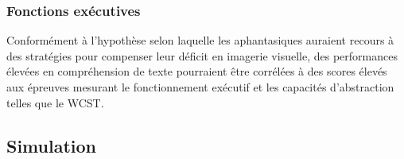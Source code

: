 \documentclass[
  12pt,
]{article}
\begin{document}
\hypertarget{fonctions-exuxe9cutives}{%
\subsubsection{Fonctions exécutives}\label{fonctions-exuxe9cutives}}

Conformément à l'hypothèse selon laquelle les aphantasiques auraient
recours à des stratégies pour compenser leur déficit en imagerie
visuelle, des performances élevées en compréhension de texte pourraient
être corrélées à des scores élevés aux épreuves mesurant le
fonctionnement exécutif et les capacités d'abstraction telles que le
WCST.

\hypertarget{simulation}{%
\subsection{Simulation}\label{simulation}}
\end{document}
